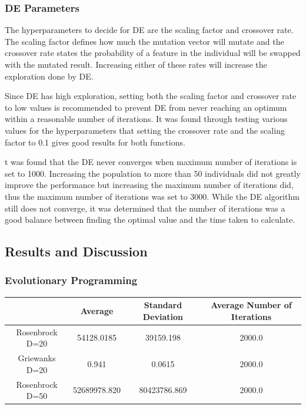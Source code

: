 \documentclass{article}
\begin{document}
\subsubsection*{DE Parameters}
The hyperparameters to decide for DE are the scaling factor and crossover rate. The scaling factor defines how much the mutation vector will mutate and the crossover rate states the probability of a feature in the individual will be swapped with the mutated result. Increasing either of these rates will increase the exploration done by DE. \par
\noindent Since DE has high exploration, setting both the scaling factor and crossover rate to low values is recommended to prevent DE from never reaching an optimum within a reasonable number of iterations. It was found through testing various values for the hyperparameters that setting the crossover rate and the scaling factor to 0.1 gives good results for both functions. \par
\noindent t was found that the DE never converges when maximum number of iterations is set to 1000. Increasing the population to more than 50 individuals did not greatly improve the performance but increasing the maximum number of iterations did, thus the maximum number of iterations was set to 3000. While the DE algorithm still does not converge, it was determined that the number of iterations was a good balance between finding the optimal value and the time taken to calculate. \par
\subsection*{Results and Discussion}
\subsubsection*{Evolutionary Programming}
\begin{center}
	\begin{tabular}{|c|c|c|c|}
		\hline
		& Average & Standard Deviation & Average Number of Iterations \\
		\hline
		Rosenbrock D=20 & 54128.0185 & 39159.198 & 2000.0 \\
		\hline
		Griewanks D=20 & 0.941 & 0.0615 & 2000.0 \\
		\hline
		Rosenbrock D=50 & 52689978.820 & 80423786.869 & 2000.0 \\
		\hline
	\end{tabular}
\end{center}
\end{document}
